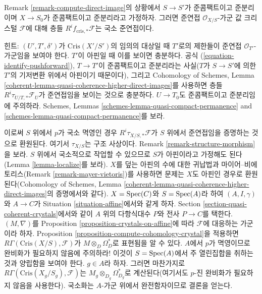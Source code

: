 \begin{remark}[준연접성]
\label{remark-quasi-coherent}
Remark \ref{remark-compute-direct-image}의 상황에서 $S \to S'$가
준콤팩트이고 준분리이며 $X \to S_0$가 준콤팩트이고 준분리라고
가정하자. 그러면 준연접 $\mathcal{O}_{X/S}$-가군 값 크리스털
$\mathcal{F}$에 대해 층들 $R^if_{\text{cris}, *}\mathcal{F}$는
국소 준연접이다.

\medskip\noindent
힌트: $(U', T', \delta')$가 $\text{Cris}(X'/S')$의 임의의 대상일
때 $T'$로의 제한들이 준연접 $\mathcal{O}_{T'}$-가군임을 보여야
한다. $T'$이 아핀일 때 이를 보이면 충분하다. 공식
(\ref{equation-identify-pushforward}), $T \to T'$이 준콤팩트이고
준분리라는 사실($T$가 $S \to S'$에 의한 $T'$의 기저변환 위에서
아핀이기 때문이다), 그리고 Cohomology of Schemes, Lemma
\ref{coherent-lemma-quasi-coherence-higher-direct-images}를 사용하면
층들 $R^i\tau_{U/T, *}\mathcal{F}_U$가 준연접임을 보이는 것으로
충분하다. $U \to T_0$도 준콤팩트이고 준분리임에 주의하라.
Schemes, Lemmas \ref{schemes-lemma-quasi-compact-permanence} and
\ref{schemes-lemma-quasi-compact-permanence}를 보라.

\medskip\noindent
이로써 $S$ 위에서 $p$가 국소 멱영인 경우
$R^i\tau_{X/S, *}\mathcal{F}$가 $S$ 위에서 준연접임을 증명하는
것으로 환원된다. 여기서 $\tau_{X/S}$는 구조 사상이다. Remark
\ref{remark-structure-morphism}을 보라. $S$ 위에서 국소적으로
작업할 수 있으므로 $S$가 아핀이라고 가정해도 된다(Lemma
\ref{lemma-localize}를 보라). $X$를 덮는 아핀의 수에 대한 귀납법과
마이어--비에토리스(Remark \ref{remark-mayer-vietoris})를 사용하면
문제는 $X$도 아핀인 경우로 환원된다(Cohomology of Schemes, Lemma
\ref{coherent-lemma-quasi-coherence-higher-direct-images}의 증명에서와
같다). $X = \mathop{\mathrm{Spec}}(C)$와 $S = \mathop{\mathrm{Spec}}(A)$라 하여 $(A, I, \gamma)$와
$A \to C$가 Situation \ref{situation-affine}에서와 같게 하자.
Section \ref{section-quasi-coherent-crystals}에서와 같이 $A$ 위의
다항식대수 $P$와 전사 $P \to C$를 택한다. $(M, \nabla)$를
Proposition \ref{proposition-crystals-on-affine}에 따라 $\mathcal{F}$에
대응하는 가군이라 하자. Proposition
\ref{proposition-compute-cohomology-crystal}을 적용하면
$R\Gamma(\text{Cris}(X/S), \mathcal{F})$가
$M \otimes_D \Omega_D^*$로 표현됨을 알 수 있다. $A$에서 $p$가
멱영이므로 완비화가 필요하지 않음에 주의하라! 이것이
$S = \mathop{\mathrm{Spec}}(A)$에서 주 열린집합을 취하는 것과 양립함을 보여야 한다.
$g \in A$라 하자. 그러면 마찬가지로
$R\Gamma(\text{Cris}(X_g/S_g), \mathcal{F})$는
$M_g \otimes_{D_g} \Omega_{D_g}^*$로 계산된다(여기서도 $p$-진
완비화가 필요하지 않음을 사용한다). 국소화는 $A$-가군 위에서
완전함자이므로 결론을 얻는다.
\end{remark}

